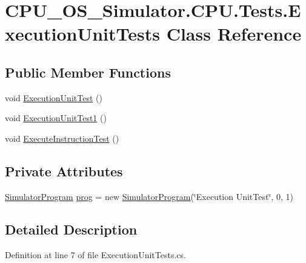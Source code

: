 \hypertarget{class_c_p_u___o_s___simulator_1_1_c_p_u_1_1_tests_1_1_execution_unit_tests}{}\section{C\+P\+U\+\_\+\+O\+S\+\_\+\+Simulator.\+C\+P\+U.\+Tests.\+Execution\+Unit\+Tests Class Reference}
\label{class_c_p_u___o_s___simulator_1_1_c_p_u_1_1_tests_1_1_execution_unit_tests}
\subsection*{Public Member Functions}
\begin{DoxyCompactItemize}
\item 
void \hyperlink{class_c_p_u___o_s___simulator_1_1_c_p_u_1_1_tests_1_1_execution_unit_tests_aaf269c98f9007b95804b7968a60824f4}{Execution\+Unit\+Test} ()
\item 
void \hyperlink{class_c_p_u___o_s___simulator_1_1_c_p_u_1_1_tests_1_1_execution_unit_tests_a1fbe0d28afb517a2d633d88189f01b68}{Execution\+Unit\+Test1} ()
\item 
void \hyperlink{class_c_p_u___o_s___simulator_1_1_c_p_u_1_1_tests_1_1_execution_unit_tests_a5316a7da14de055e3c3d06ca62832f03}{Execute\+Instruction\+Test} ()
\end{DoxyCompactItemize}
\subsection*{Private Attributes}
\begin{DoxyCompactItemize}
\item 
\hyperlink{class_c_p_u___o_s___simulator_1_1_c_p_u_1_1_simulator_program}{Simulator\+Program} \hyperlink{class_c_p_u___o_s___simulator_1_1_c_p_u_1_1_tests_1_1_execution_unit_tests_ac62f9fcd8038819097fcd0d32376c182}{prog} = new \hyperlink{class_c_p_u___o_s___simulator_1_1_c_p_u_1_1_simulator_program}{Simulator\+Program}(\char`\"{}Execution Unit\+Test\char`\"{}, 0, 1)
\end{DoxyCompactItemize}


\subsection{Detailed Description}


Definition at line 7 of file Execution\+Unit\+Tests.\+cs.



